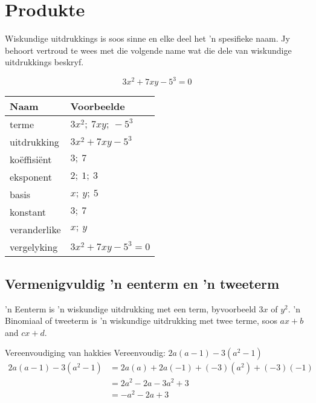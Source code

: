 \section{Produkte}
\setcounter{figure}{1}
\setcounter{subfigure}{1}

%   
\nopagebreak
Wiskundige uitdrukkings is soos sinne en elke deel het ’n spesifieke naam. Jy behoort vertroud te wees met die volgende name wat die dele van wiskundige uitdrukkings beskryf.\par 

\begin{equation*}
3x^2 + 7xy -5^3 = 0
\end{equation*}


\begin{table}[H]
\begin{center}
\begin{tabular}{|l|l|}
\hline
\textbf{Naam} & \textbf{Voorbeelde} \\
\hline
terme & $3x^2;~7xy;~-5^3$\\ \hline
uitdrukking & $3x^2 + 7xy -5^3$\\ \hline
koëffisiënt & $3;~7$\\ \hline
eksponent & $2;~1;~3$\\ \hline
basis & $x;~y;~5$\\ \hline
konstant & $3;~7$\\ \hline
veranderlike & $x;~y$\\ \hline
vergelyking & $3x^2 + 7xy -5^3 = 0$\\ \hline


\end{tabular}
\end{center}
\end{table} 

\par

\subsection*{Vermenigvuldig 'n eenterm en 'n tweeterm}
’n Eenterm is ’n wiskundige uitdrukking met een term, byvoorbeeld $3x$ of $y^2$. ’n Binomiaal of tweeterm is ’n wiskundige uitdrukking met twee terme, soos $ax+b$ and $cx+d$.

\begin{wex}{Vereenvoudiging van hakkies}
{Vereenvoudig: $2a(a-1) - 3(a^{2}-1)$}
{
\begin{align*}
  2a(a-1) -3(a^{2}-1) &= 2a(a) + 2a(-1) + (-3)(a^{2})+(-3)(-1) \\
  &= 2a^{2} - 2a - 3a^{2} + 3 \\
  &= -a^{2} -2a + 3
\end{align*}
}
\end{wex}

